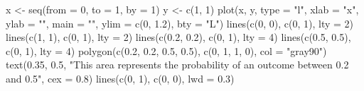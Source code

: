 \begin{Schunk}
\begin{Sinput}
 x <- seq(from = 0, to = 1, by = 1)
 y <- c(1, 1)
 plot(x, y, type = "l", xlab = "x", ylab = "", main = "", ylim = c(0, 1.2), bty = "L")
 lines(c(0, 0), c(0, 1), lty = 2)
 lines(c(1, 1), c(0, 1), lty = 2)
 lines(c(0.2, 0.2), c(0, 1), lty = 4)
 lines(c(0.5, 0.5), c(0, 1), lty = 4)
 polygon(c(0.2, 0.2, 0.5, 0.5), c(0, 1, 1, 0), col = "gray90")
 text(0.35, 0.5, "This area represents \n the probability \n of an outcome \n between 0.2 and 0.5", 
      cex = 0.8)
 lines(c(0, 1), c(0, 0), lwd = 0.3)
\end{Sinput}
\end{Schunk}
